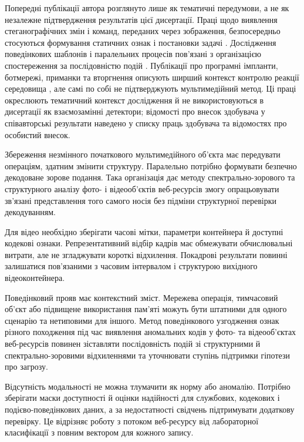 Попередні публікації автора розглянуто лише як тематичні передумови, а не як незалежне підтвердження результатів цієї дисертації. Праці щодо виявлення стеганографічних змін і команд, переданих через зображення, безпосередньо стосуються формування статичних ознак і постановки задачі \cite{denysiuk2023steganalysis,denysiuk2025commands}. Дослідження поведінкових шаблонів і паралельних процесів пов’язані з організацією спостереження за послідовністю подій \cite{denysiuk2024behavior,denysiuk2025parallel}. Публікації про програмні імпланти, ботмережі, приманки та вторгнення описують ширший контекст контролю реакції середовища \cite{denysiuk2024implantscorporate,denysiuk2024botnets,denysiuk2024decoysystem,denysiuk2024systemdecoys,denysiuk2024intrusions}, але самі по собі не підтверджують мультимедійний метод. Ці праці окреслюють тематичний контекст дослідження й не використовуються в дисертації як взаємозамінні детектори; відомості про внесок здобувача у співавторські результати наведено у списку праць здобувача та відомостях про особистий внесок.

Збереження незмінного початкового мультимедійного об’єкта має передувати операціям, здатним змінити структуру. Паралельно потрібно формувати безпечно декодоване зорове подання. Така організація дає методу спектрально-зорового та структурного аналізу фото- і відеооб’єктів веб-ресурсів змогу опрацьовувати зв’язані представлення того самого носія без підміни структурної перевірки декодуванням.

Для відео необхідно зберігати часові мітки, параметри контейнера й доступні кодекові ознаки. Репрезентативний відбір кадрів має обмежувати обчислювальні витрати, але не згладжувати короткі відхилення. Покадрові результати повинні залишатися пов’язаними з часовим інтервалом і структурою вихідного відеоконтейнера.

Поведінковий прояв має контекстний зміст. Мережева операція, тимчасовий об’єкт або підвищене використання пам’яті можуть бути штатними для одного сценарію та нетиповими для іншого. Метод поведінкового узгодження ознак різного походження під час виявлення аномальних кодів у фото- та відеооб’єктах веб-ресурсів повинен зіставляти послідовність подій зі структурними й спектрально-зоровими відхиленнями та уточнювати ступінь підтримки гіпотези про загрозу.

Відсутність модальності не можна тлумачити як норму або аномалію. Потрібно зберігати маски доступності й оцінки надійності для службових, кодекових і подієво-поведінкових даних, а за недостатності свідчень підтримувати додаткову перевірку. Це відрізняє роботу з потоком веб-ресурсу від лабораторної класифікації з повним вектором для кожного запису.

